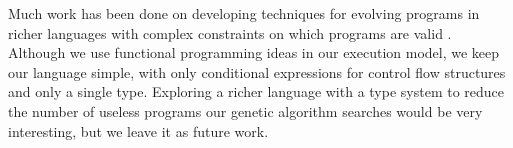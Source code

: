 Much work has been done on developing techniques for evolving programs in
richer languages with complex constraints on which programs are valid
\cite{BriggsGP}.
Although we use functional programming ideas in our execution model, we keep
our language simple, with only conditional expressions for control flow
structures and only a single type.
Exploring a richer language with a type system to reduce the number of useless
programs our genetic algorithm searches would be very interesting, but we leave
it as future work.
